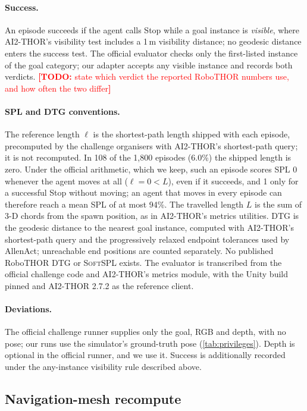 \documentclass[10pt]{article}
\newcommand{\TODO}[1]{\textcolor{red}{\textbf{[TODO:} #1\textbf{]}}}
\newcommand{\SPL}{\textsc{SPL}\xspace}
\newcommand{\SoftSPL}{\textsc{SoftSPL}\xspace}
\newcommand{\DTG}{\textsc{DTG}\xspace}
\begin{document}
\paragraph{Success.} An episode succeeds if the agent calls Stop while a goal instance is \emph{visible}, where AI2-THOR's visibility test includes a 1\,m visibility distance; no geodesic distance enters the success test. The official evaluator checks only the first-listed instance of the goal category; our adapter accepts any visible instance and records both verdicts. \TODO{state which verdict the reported RoboTHOR numbers use, and how often the two differ}

\paragraph{SPL and DTG conventions.} The reference length $\ell$ is the shortest-path length shipped with each episode, precomputed by the challenge organisers with AI2-THOR's shortest-path query; it is not recomputed. In 108 of the 1{,}800 episodes (6.0\%) the shipped length is zero. Under the official arithmetic, which we keep, such an episode scores \SPL 0 whenever the agent moves at all ($\ell = 0 < L$), even if it succeeds, and 1 only for a successful Stop without moving; an agent that moves in every episode can therefore reach a mean \SPL of at most 94\%. The travelled length $L$ is the sum of 3-D chords from the spawn position, as in AI2-THOR's metrics utilities. \DTG is the geodesic distance to the nearest goal instance, computed with AI2-THOR's shortest-path query and the progressively relaxed endpoint tolerances used by AllenAct; unreachable end positions are counted separately. No published RoboTHOR \DTG or \SoftSPL exists. The evaluator is transcribed from the official challenge code and AI2-THOR's metrics module, with the Unity build pinned and AI2-THOR 2.7.2 as the reference client.

\paragraph{Deviations.} The official challenge runner supplies only the goal, RGB and depth, with no pose; our runs use the simulator's ground-truth pose (\cref{tab:privileges}). Depth is optional in the official runner, and we use it. Success is additionally recorded under the any-instance visibility rule described above.

\subsection{Navigation-mesh recompute}\label{app:protocols-navmesh}
\end{document}
